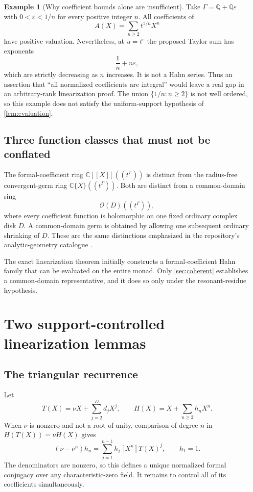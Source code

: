 \documentclass[11pt,letterpaper]{article}
\numberwithin{equation}{section}
\theoremstyle{plain}
\theoremstyle{definition}
\newtheorem{example}[theorem]{Example}
\theoremstyle{remark}
\newcommand{\C}{\mathbb C}
\newcommand{\Q}{\mathbb Q}
\newcommand{\OO}{\mathcal O}
\begin{document}
\begin{example}[Why coefficient bounds alone are insufficient]\label{ex:bad-support}
Take $\Gamma=\Q+\Q\varepsilon$ with $0<\varepsilon<1/n$ for every positive
integer $n$. All coefficients of
\[
 A(X)=\sum_{n\ge2}t^{1/n}X^n
\]
have positive valuation. Nevertheless, at $u=t^\varepsilon$ the proposed
Taylor sum has exponents
\[
  \frac1n+n\varepsilon,
\]
which are strictly decreasing as $n$ increases. It is not a Hahn series.
Thus an assertion that ``all normalized coefficients are integral'' would
leave a real gap in an arbitrary-rank linearization proof. The union
$\{1/n:n\ge2\}$ is not well ordered, so this example does not satisfy the
uniform-support hypothesis of \cref{lem:evaluation}.
\end{example}

\subsection{Three function classes that must not be conflated}

The formal-coefficient ring $\C[[X]]((t^\Gamma))$ is distinct from the
radius-free convergent-germ ring $\C\{X\}((t^\Gamma))$. Both are distinct
from a common-domain ring
\[
 \OO(D)((t^\Gamma)),
\]
where every coefficient function is holomorphic on one fixed ordinary
complex disk $D$. A common-domain germ is obtained by allowing one subsequent
ordinary shrinking of $D$. These are the same distinctions emphasized in the
repository's analytic-geometry catalogue \cite{repo}.

The exact linearization theorem initially constructs a formal-coefficient
Hahn family that can be evaluated on the entire monad. Only
\cref{sec:coherent} establishes a common-domain representative, and it does
so only under the resonant-residue hypothesis.

\section{Two support-controlled linearization lemmas}\label{sec:linear-lemmas}

\subsection{The triangular recurrence}

Let
\[
 T(X)=\nu X+\sum_{j=2}^{D}d_jX^j,\qquad
 H(X)=X+\sum_{n\ge2}h_nX^n.
\]
When $\nu$ is nonzero and not a root of unity, comparison of degree $n$ in
$H(T(X))=\nu H(X)$ gives
\begin{equation}\label{eq:recurrence}
 (\nu-\nu^n)h_n
   =\sum_{j=1}^{n-1}h_j[X^n]T(X)^j,\qquad h_1=1.
\end{equation}
The denominators are nonzero, so this defines a unique normalized formal
conjugacy over any characteristic-zero field. It remains to control all of
its coefficients simultaneously.
\end{document}
